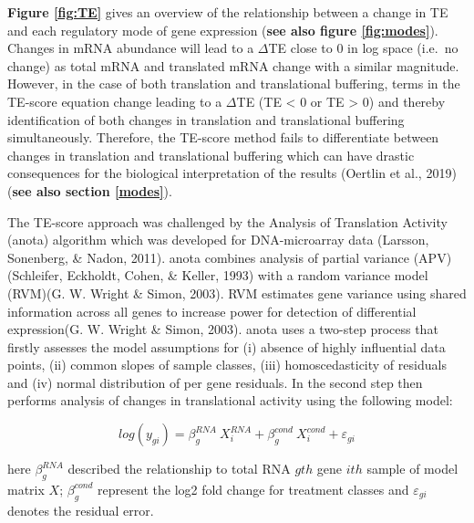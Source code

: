 \documentclass[12pt,openany]{book}
\begin{document}
\textbf{Figure \ref{fig:TE}} gives an overview of the relationship
between a change in TE and each regulatory mode of gene expression
(\textbf{see also figure \ref{fig:modes}}). Changes in mRNA abundance
will lead to a \(\varDelta\)TE close to 0 in log space (i.e.~no change)
as total mRNA and translated mRNA change with a similar magnitude.
However, in the case of both translation and translational buffering,
terms in the TE-score equation change leading to a \(\varDelta\)TE (TE
\textless{} 0 or TE \textgreater{} 0) and thereby identification of both
changes in translation and translational buffering simultaneously.
Therefore, the TE-score method fails to differentiate between changes in
translation and translational buffering which can have drastic
consequences for the biological interpretation of the results (Oertlin
et al., 2019) (\textbf{see also section \ref{modes}}).

The TE-score approach was challenged by the Analysis of Translation
Activity (anota) algorithm which was developed for DNA-microarray data
(Larsson, Sonenberg, \& Nadon, 2011). anota combines analysis of partial
variance (APV)(Schleifer, Eckholdt, Cohen, \& Keller, 1993) with a
random variance model (RVM)(G. W. Wright \& Simon, 2003). RVM estimates
gene variance using shared information across all genes to increase
power for detection of differential expression(G. W. Wright \& Simon,
2003). anota uses a two-step process that firstly assesses the model
assumptions for (i) absence of highly influential data points, (ii)
common slopes of sample classes, (iii) homoscedasticity of residuals and
(iv) normal distribution of per gene residuals. In the second step then
performs analysis of changes in translational activity using the
following model:

\[log(y_{gi}) = \beta_g^{RNA}\ X_i^{RNA}+ \beta_g^{cond}\ X_i^{cond} + \varepsilon_{gi}\]

here \(\beta_g^{RNA}\) described the relationship to total RNA \(gth\)
gene \(ith\) sample of model matrix \(X\); \(\beta_g^{cond}\) represent
the log2 fold change for treatment classes and \(\varepsilon_{gi}\)
denotes the residual error.
\end{document}
